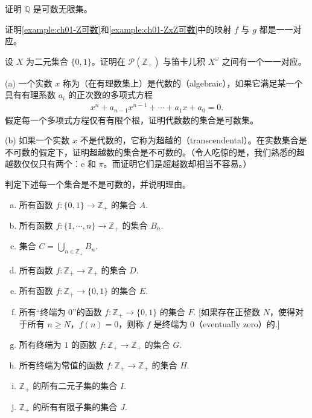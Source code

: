 \documentclass[../../main.tex]{subfiles}
\begin{document}
\begin{exercise}\label{exercise:ch01-可数集-1}
证明 $\mathbb{Q}$ 是可数无限集。
\end{exercise}

\begin{exercise}\label{exercise:ch01-可数集-2}
证明\cref{example:ch01-Z可数}和\cref{example:ch01-ZxZ可数}中的映射 $f$ 与 $g$ 都是一一对应。
\end{exercise}

\begin{exercise}\label{exercise:ch01-可数集-3}
设 $X$ 为二元集合 $\{0, 1\}$。证明在 $\mathcal{P}(\mathbb{Z}_{+})$ 与笛卡儿积 $X^{\omega}$ 之间有一个一一对应。
\end{exercise}

\begin{exercise}\label{exercise:ch01-可数集-4}
(a) 一个实数 $x$ 称为（在有理数集上）是代数的（algebraic），如果它满足某一个具有有理系数 $a_{i}$ 的正次数的多项式方程
\begin{align*}
x^{n} + a_{n-1}x^{n-1} + \cdots + a_{1}x + a_{0} = 0.
\end{align*}
假定每一个多项式方程仅有有限个根，证明代数数的集合是可数集。

(b) 如果一个实数 $x$ 不是代数的，它称为超越的（transcendental）。在实数集合是不可数的假定下，证明超越数的集合是不可数的。（令人吃惊的是，我们熟悉的超越数仅仅只有两个：e 和 $\pi$。而证明它们是超越数却相当不容易。）
\end{exercise}

\begin{exercise}\label{exercise:ch01-可数集-5}
判定下述每一个集合是不是可数的，并说明理由。
\begin{enumerate}[(a)]
\item 所有函数 $f: \{0, 1\} \longrightarrow \mathbb{Z}_{+}$ 的集合 $A$.
\item 所有函数 $f: \{1, \cdots, n\} \longrightarrow \mathbb{Z}_{+}$ 的集合 $B_{n}$.
\item 集合 $C = \bigcup_{n \in \mathbb{Z}_{+}} B_{n}$.
\item 所有函数 $f: \mathbb{Z}_{+} \longrightarrow \mathbb{Z}_{+}$ 的集合 $D$.
\item 所有函数 $f: \mathbb{Z}_{+} \longrightarrow \{0, 1\}$ 的集合 $E$.
\item 所有“终端为 $0$”的函数 $f: \mathbb{Z}_{+} \longrightarrow \{0, 1\}$ 的集合 $F$. [如果存在正整数 $N$，使得对于所有 $n \geqslant N$，$f(n) = 0$，则称 $f$ 是终端为 $0$（eventually zero）的.]
\item 所有终端为 $1$ 的函数 $f: \mathbb{Z}_{+} \longrightarrow \mathbb{Z}_{+}$ 的集合 $G$.
\item 所有终端为常值的函数 $f: \mathbb{Z}_{+} \longrightarrow \mathbb{Z}_{+}$ 的集合 $H$.
\item $\mathbb{Z}_{+}$ 的所有二元子集的集合 $I$.
\item $\mathbb{Z}_{+}$ 的所有有限子集的集合 $J$.
\end{enumerate}
\end{exercise}
\end{document}
